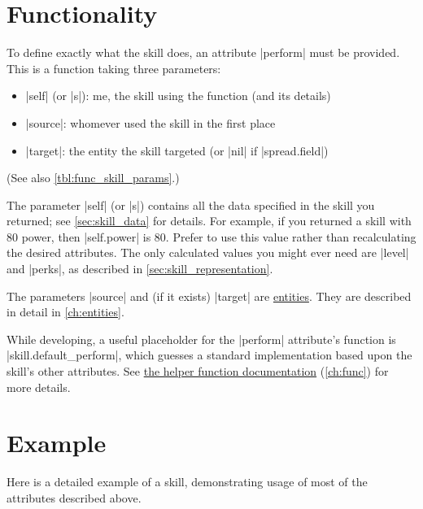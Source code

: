 \section{Functionality}
\label{sec:skill_func}

To define exactly what the skill does, an attribute |perform| must be provided.
This is a function taking three parameters:
\begin{itemize}[noitemsep]
    \item |self| (or |s|): me, the skill using the function (and its details)
    \item |source|: whomever used the skill in the first place
    \item |target|: the entity the skill targeted (or |nil| if |spread.field|)
\end{itemize}

(See also \autoref{tbl:func_skill_params}.)

The parameter |self| (or |s|) contains
all the data specified in the skill you returned;
see \autoref{sec:skill_data} for details.
For example, if you returned a skill with 80 power, then |self.power| is 80.
Prefer to use this value rather than recalculating the desired attributes.
The only calculated values you might ever need are |level| and |perks|,
as described in \autoref{sec:skill_representation}.

The parameters |source| and (if it exists) |target|
are \hyperref[ch:entities]{entities}.
They are described in detail in \autoref{ch:entities}.

While developing, a useful placeholder for the |perform| attribute's function is
|skill.default_perform|, which guesses a standard implementation
based upon the skill's other attributes.
See \hyperref[ch:func]{the helper function documentation}
(\autoref{ch:func}) for more details.

\section{Example}
\label{sec:skill_example}

Here is a detailed example of a skill,
demonstrating usage of most of the attributes described above.

